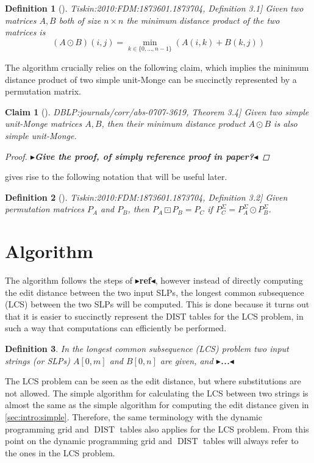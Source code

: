 \documentclass[twoside,11pt,openright]{report}
\newcommand{\todo}[1]{{\color[rgb]{.5,0,0}\textbf{$\blacktriangleright$#1$\blacktriangleleft$}}}
\newcommand{\DIST}{\operatorname{DIST}}
\newcommand{\str}[3]{#1[#2, #3]}
\newcommand{\refbook}[2]{\cite[#1]{DBLP:journals/corr/abs-0707-3619}, #2}
\newcommand{\reftiskin}[2]{\cite[#1]{Tiskin:2010:FDM:1873601.1873704}, #2}
\newtheorem{mydef}{Definition}
\newtheorem{claim}{Claim}
\begin{document}
\begin{mydef}[\reftiskin{p. 1289}{Definition 3.1}]
  Given two matrices $A, B$ both of size $n \times n$ the minimum distance product of the two matrices is
  \[
    (A \odot B)(i, j) = \min_{k \in \{ 0, \dots, n - 1 \}} \left( A(i, k) + B(k, j) \right)
  \]
\end{mydef}
The algorithm crucially relies on the following claim, which implies the minimum distance product of two simple unit-Monge can be succinctly represented by a permutation matrix.
\begin{claim}[\refbook{p. 16}{Theorem 3.4}]
  \label{claim:unit-monge-min-prod-closed}
  Given two simple unit-Monge matrices $A, B$, then their minimum distance product $A \odot B$ is also simple unit-Monge.
  \begin{proof}
    \todo{Give the proof, of simply reference proof in paper?}
  \end{proof}
\end{claim}
 gives rise to the following notation that will be useful later.
\begin{mydef}[\reftiskin{p. 1289}{Definition 3.2}]
  Given permutation matrices $P_A$ and $P_B$, then $P_A \boxdot P_B = P_C$ if $P_C^{\Sigma} = P_A^{\Sigma} \odot P_B^{\Sigma}$.
\end{mydef}

\section{Algorithm}
The algorithm follows the steps of \todo{ref}, however instead of directly computing the edit distance between the two input SLPs, the longest common subsequence (LCS) between the two SLPs will be computed. This is done because it turns out that it is easier to succinctly represent the DIST tables for the LCS problem, in such a way that computations can efficiently be performed.

\begin{mydef}
  In the longest common subsequence (LCS) problem two input strings (or SLPs) $\str{A}{0}{m}$ and $\str{B}{0}{n}$ are given, and \todo{...}
\end{mydef}

The LCS problem can be seen as the edit distance, but where substitutions are not allowed. The simple algorithm for calculating the LCS between two strings is almost the same as the simple algorithm for computing the edit distance given in \cref{sec:intro:simple}. Therefore, the same terminology with the dynamic programming grid and $\DIST$ tables also applies for the LCS problem. From this point on the dynamic programming grid and $\DIST$ tables will always refer to the ones in the LCS problem. 
\end{document}
